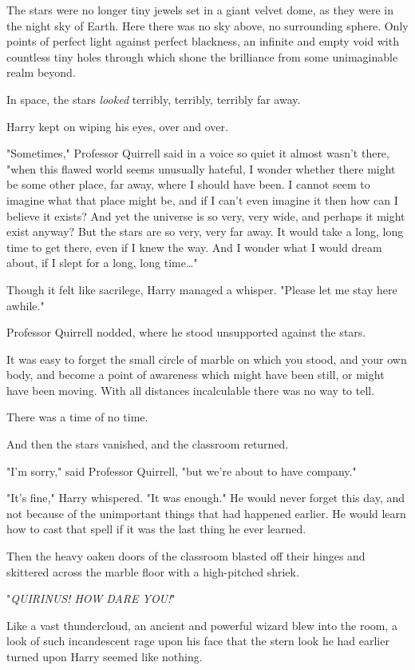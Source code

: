 The stars were no longer tiny jewels set in a giant velvet dome, as they were
in the night sky of Earth. Here there was no sky above, no surrounding sphere.
Only points of perfect light against perfect blackness, an infinite and empty
void with countless tiny holes through which shone the brilliance from some
unimaginable realm beyond.

In space, the stars \emph{looked} terribly, terribly, terribly far away.

Harry kept on wiping his eyes, over and over.

"Sometimes," Professor Quirrell said in a voice so quiet it almost wasn't
there, "when this flawed world seems unusually hateful, I wonder whether there
might be some other place, far away, where I should have been. I cannot seem to
imagine what that place might be, and if I can't even imagine it then how can I
believe it exists? And yet the universe is so very, very wide, and perhaps it
might exist anyway? But the stars are so very, very far away. It would take a
long, long time to get there, even if I knew the way. And I wonder what I would
dream about, if I slept for a long, long time…"

Though it felt like sacrilege, Harry managed a whisper. "Please let me stay
here awhile."

Professor Quirrell nodded, where he stood unsupported against the stars.

It was easy to forget the small circle of marble on which you stood, and your
own body, and become a point of awareness which might have been still, or might
have been moving. With all distances incalculable there was no way to tell.

There was a time of no time.

And then the stars vanished, and the classroom returned.

"I'm sorry," said Professor Quirrell, "but we're about to have company."

"It's fine," Harry whispered. "It was enough." He would never forget this day,
and not because of the unimportant things that had happened earlier. He would
learn how to cast that spell if it was the last thing he ever learned.

Then the heavy oaken doors of the classroom blasted off their hinges and
skittered across the marble floor with a high-pitched shriek.

"\emph{QUIRINUS! HOW DARE YOU!}"

Like a vast thundercloud, an ancient and powerful wizard blew into the room, a
look of such incandescent rage upon his face that the stern look he had earlier
turned upon Harry seemed like nothing.


